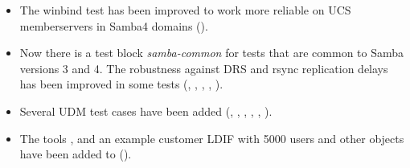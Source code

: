 \begin{itemize}
\item The winbind test has been improved to work more reliable on UCS memberservers in Samba4 domains ().

\item Now there is a test block \emph{samba-common} for tests that are common to Samba versions 3 and 4.
The robustness against DRS and rsync replication delays has been improved in some tests (, , , , ).

\item Several UDM test cases have been added (, , , , , ).

\item The tools , 
and an example customer LDIF with 5000 users and other objects have been added to
 ().

\end{itemize}


